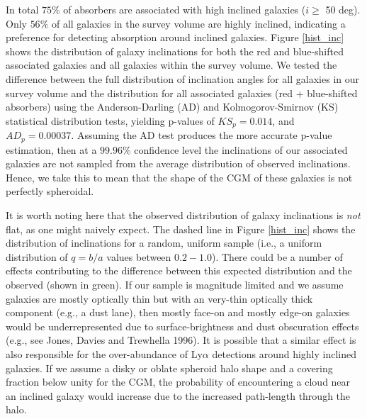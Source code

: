\documentclass[iop]{emulateapj-rtx4}
\begin{document}
In total $75\%$ of absorbers are associated with high inclined galaxies ($i \geq$ 50 deg). Only $56\%$ of all galaxies in the survey volume are highly inclined, indicating a preference for detecting absorption around inclined galaxies. Figure \ref{hist_inc} shows the distribution of galaxy inclinations for both the red and blue-shifted associated galaxies and all galaxies within the survey volume. We tested the difference between the full distribution of inclination angles for all galaxies in our survey volume and the distribution for all associated galaxies (red + blue-shifted absorbers) using the Anderson-Darling (AD) and Kolmogorov-Smirnov (KS) statistical distribution tests, yielding p-values of $KS_{p} =0.014$, and $AD_{p} = 0.00037$. Assuming the AD test produces the more accurate p-value estimation, then at a $99.96\%$ confidence level the inclinations of our associated galaxies are not sampled from the average distribution of observed inclinations. Hence, we take this to mean that the shape of the CGM of these galaxies is not perfectly spheroidal. 




It is worth noting here that the observed distribution of galaxy inclinations is \emph{not} flat, as one might naively expect. The dashed line in Figure \ref{hist_inc} shows the distribution of inclinations for a random, uniform sample (i.e., a uniform distribution of $q=b/a$ values between $0.2 - 1.0$). There could be a number of effects contributing to the difference between this expected distribution and the observed (shown in green). If our sample is magnitude limited and we assume galaxies are mostly optically thin but with an very-thin optically thick component (e.g., a dust lane), then mostly face-on and mostly edge-on galaxies would be underrepresented due to surface-brightness and dust obscuration effects (e.g., see Jones, Davies and Trewhella 1996). It is possible that a similar effect is also responsible for the over-abundance of Ly$\alpha$ detections around highly inclined galaxies. If we assume a disky or oblate spheroid halo shape and a covering fraction below unity for the CGM, the probability of encountering a cloud near an inclined galaxy would increase due to the increased path-length through the halo.
\end{document}

